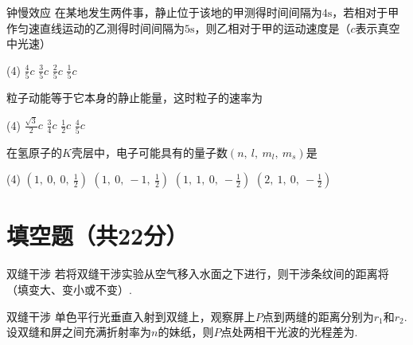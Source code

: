 {\begin{choice}[B]{钟慢效应}
    在某地发生两件事，静止位于该地的甲测得时间间隔为$4\mathrm{s}$，若相对于甲作匀速直线运动的乙测得时间间隔为$5\mathrm{s}$，则乙相对于甲的运动速度是（$c$表示真空中光速）
    \begin{tasks}(4)
        \task $\frac{4}{5}c$
        \task $\frac{3}{5}c$
        \task $\frac{2}{5}c$
        \task $\frac{1}{5}c$
    \end{tasks}
\end{choice}

\begin{choice}[A]{}
    粒子动能等于它本身的静止能量，这时粒子的速率为
    \begin{tasks}(4)
        \task $\frac{\sqrt{3}}{2}c$
        \task $\frac{3}{4}c$
        \task $\frac{1}{2}c$
        \task $\frac{4}{5}c$
    \end{tasks}
\end{choice}

\begin{choice}[A]{}
    在氢原子的$K$壳层中，电子可能具有的量子数$(n,\ l,\ m_l,\ m_s)$是
    \begin{tasks}(4)
        \task $(1,\ 0,\ 0,\ \frac{1}{2})$
        \task $(1,\ 0,\ -1,\ \frac{1}{2})$
        \task $(1,\ 1,\ 0,\ -\frac{1}{2})$
        \task $(2,\ 1,\ 0,\ -\frac{1}{2})$
    \end{tasks}
\end{choice}
}

\section{填空题（共22分）}
\begin{exercise}[2]{双缝干涉}
    若将双缝干涉实验从空气移入水面之下进行，则干涉条纹间的距离将（填变大、变小或不变）.
\end{exercise}

\begin{exercise}[2]{双缝干涉}
单色平行光垂直入射到双缝上，观察屏上$P$点到两缝的距离分别为$r_1$和$r_2$.设双缝和屏之间充满折射率为$n$的妹纸，则$P$点处两相干光波的光程差为.
\end{exercise}


